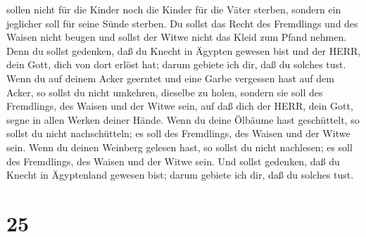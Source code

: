 sollen nicht für die Kinder noch die Kinder für die Väter sterben,
sondern ein jeglicher soll für seine Sünde sterben.  Du
sollst das Recht des Fremdlings und des Waisen nicht beugen und sollst
der Witwe nicht das Kleid zum Pfand nehmen.  Denn du sollst
gedenken, daß du Knecht in Ägypten gewesen bist und der HERR, dein Gott,
dich von dort erlöst hat; darum gebiete ich dir, daß du solches tust.
 Wenn du auf deinem Acker geerntet und eine Garbe vergessen
hast auf dem Acker, so sollst du nicht umkehren, dieselbe zu holen,
sondern sie soll des Fremdlings, des Waisen und der Witwe sein, auf daß
dich der HERR, dein Gott, segne in allen Werken deiner Hände.
 Wenn du deine Ölbäume hast geschüttelt, so sollst du nicht
nachschütteln; es soll des Fremdlings, des Waisen und der Witwe sein.
 Wenn du deinen Weinberg gelesen hast, so sollst du nicht
nachlesen; es soll des Fremdlings, des Waisen und der Witwe sein.
 Und sollst gedenken, daß du Knecht in Ägyptenland gewesen
bist; darum gebiete ich dir, daß du solches tust.

\hypertarget{section-24}{%
\section{25}\label{section-24}}

